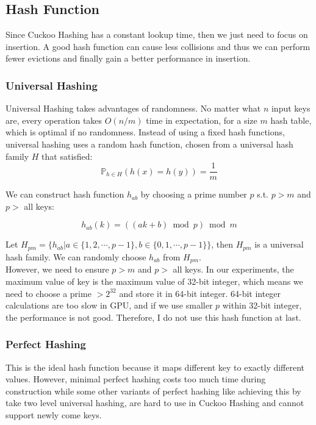 \documentclass[10pt,twocolumn,letterpaper]{article}
\begin{document}
\subsection{Hash Function}

Since Cuckoo Hashing has a constant lookup time, then we just need to focus on insertion. A good hash function can cause less collisions and thus we can perform fewer evictions and finally gain a better performance in insertion.

\subsubsection{Universal Hashing}

Universal Hashing takes advantages of randomness. No matter what $n$ input keys are, every operation takes $O(n / m)$ time in expectation, for a size $m$ hash table, which is optimal if no randomness. Instead of using a fixed hash functions, universal hashing uses a random hash function, chosen from a universal hash family $H$ that satisfied:
$$\mathbb P_{h \in H}(h(x) = h(y)) = \frac 1 m$$

We can construct hash function $h_{ab}$ by choosing a prime number $p$ s.t. $p > m$ and $p > $ all keys:

$$h_{ab}(k) = ((ak + b) \bmod p) \bmod m$$

Let $H_{pm} = \{h_{ab} | a \in \{1, 2, \cdots, p - 1\}, b \in \{0, 1, \cdots, p - 1\}\}$, then $H_{pm}$ is a universal hash family. We can randomly choose $h_{ab}$ from $H_{pm}$.\\
However, we need to ensure $p > m$ and $p > $ all keys. In our experiments, the maximum value of key is the maximum value of 32-bit integer, which means we need to choose a prime $> 2^{32}$ and store it in 64-bit integer. 64-bit integer calculations are too slow in GPU, and if we use smaller $p$ within 32-bit integer, the performance is not good. Therefore, I do not use this hash function at last.

\subsubsection{Perfect Hashing}

This is the ideal hash function because it maps different key to exactly different values. However, minimal perfect hashing costs too much time during construction \cite{Chadalavada2017ImprovingCH} while some other variants of perfect hashing like achieving this by take two level universal hashing, are hard to use in Cuckoo Hashing and cannot support newly come keys.
\end{document}
